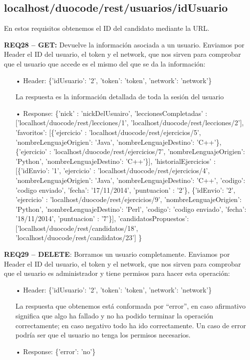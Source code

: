 \subsection{localhost/duocode/rest/usuarios/idUsuario}
En estos requisitos obtenemos el ID del candidato mediante la URL.
\vspace{1em}

\textbf{REQ28 – GET:} Devuelve la información asociada a un usuario. Enviamos por Header el ID del usuario, el token y el network, que nos sirven para comprobar que el usuario que accede es el mismo del que se da la información:

\begin{itemize}
\item[•]
Header: 
\{'idUsuario': '2', 'token': 'token', 'network': 'network'\}
\vspace{1em}

La respuesta es la información detallada de toda la sesión del usuario
\item[•]
Response: \{'nick' : 'nickDelUsuairo',
'leccionesCompletadas' : ['localhost/duocode/rest/lecciones/1', 'localhost/duocode/rest/lecciones/2'],
'favoritos': [\{'ejercicio' : 'localhost/duocode/rest/ejercicios/5', 'nombreLenguajeOrigien': 'Java', 'nombreLenguajeDestino': 'C++'\}, \{'ejercicio' : 'localhost/duocode/rest/ejercicios/7', 'nombreLenguajeOrigien': 'Python', 'nombreLenguajeDestino': 'C++'\}],
'historialEjercicios' : [\{'idEnvio': '1', 'ejercicio' : 'localhost/duocode/rest/ejercicios/4', 'nombreLenguajeOrigien': 'Java', 'nombreLenguajeDestino': 'C++', 'codigo': 'codigo enviado', 'fecha': '17/11/2014', 'puntuacion' : '2'\}, \{'idEnvio': '2', 'ejercicio' : 'localhost/duocode/rest/ejercicios/9', 'nombreLenguajeOrigien': 'Python', 'nombreLenguajeDestino': 'Perl', 'codigo': 'codigo enviado', 'fecha': '18/11/2014', 'puntuacion' : '7'\}],
'candidatosPropuestos': ['localhost/duocode/rest/candidatos/18', 'localhost/duocode/rest/candidatos/23'] \}
\end{itemize}

\textbf{REQ29 – DELETE}: Borramos un usuario completamente.
Enviamos por Header el ID del usuario, el token y el network, que nos sirven para comprobar que el usuario es administrador y tiene permisos para hacer esta operación:

\begin{itemize}
\item[•]
Header: 
\{'idUsuario': '2', 'token': 'token', 'network': 'network'\}
\vspace{1em}

La respuesta que obtenemos está conformada por “error”, en caso afirmativo significa que algo ha fallado y no ha podido terminar la operación correctamente; en caso negativo todo ha ido correctamente. Un caso de error podría ser que el usuario no tenga los permisos necesarios.

\item[•]
Response: 
\{'error': 'no'\}
\end{itemize}

